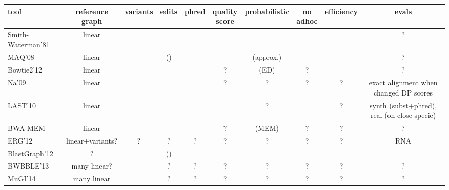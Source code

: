 \begin{table*}
	\centering
	\begin{tabular}{lccccccccc}
		\toprule
		\bf{tool}  & \specialcell{\bf{reference}\\ \bf{graph}}  & \bf{variants}  & \bf{edits}  & \bf{phred}  & \specialcell{\bf{quality}\\ \bf{score}}  & \bf{probabilistic}  & \specialcell{\bf{no}\\ \bf{adhoc}}  & \bf{efficiency}  & \bf{evals} \\
		\midrule                                                                                                                    
		Smith-Waterman'81 \cite{smith1981comparison}	& linear		& \n	& \y	& \n	& \n	& \n			& \y	& \y	& ?		\\
		MAQ'08 \cite{maq2008mapping}					& linear		& \n	& (\n)	& \y	& \y	& \y (approx.)	& \y	& \y	& ?		\\
		Bowtie2'12 \cite{langmead2012fast}				& linear		& \n	& \y	& \n	& ?		& \n (ED)		& ?		& \y	& ?		\\ %
		Na'09 \cite{na2009alignment}					& linear		& \n	& \y	& \y	& ?		& \y ?			& ?		& ?		& exact alignment when changed DP scores	\\
		LAST'10 \cite{frith2010incorporating}			& linear		& \n	& \n	& \y	& \y	& \y ? 			& \n	& ?		& synth (subst+phred), real (on close specie)		\\
		BWA-MEM											& linear		& \n	& \n	& \n	& ?		& \n (MEM)		& ?		& ?		& ?		\\
		\midrule
		ERG'12 \cite{vijaya2012new}						& linear+variants?& ?	& ?		& ?		& ?		& ?				& ?		& ?		& RNA	\\
		BlastGraph'12 \cite{holley2012blastgraph}		& \y?			& \y	& (\y)	& \n	& \n    & \n			& \n	& \n	& \n	\\
		BWBBLE'13 \cite{huang2013short}					& many linear?	& \y	& ?		& ?		& ?		& ?				& ?		& ?		& ?		\\
		MuGI'14	\cite{danek2014indexes}					& many linear	& \y	& ?		& ?		& ?		& ?				& ?		& ?		& ?		\\

\end{tabular}
\end{table*}
